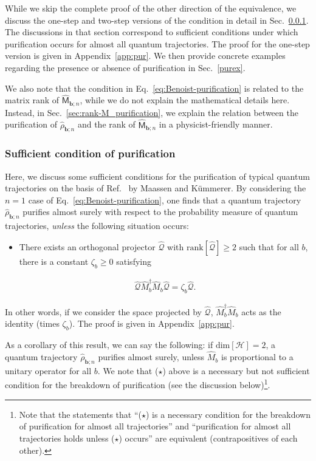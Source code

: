 \documentclass[preprint,pteplogo]{ptephy_v2}%
\numberwithin{equation}{section}
\theoremstyle{definition}
\newcommand{\ml}[1]{\mathcal{#1}}
\newcommand{\mr}[1]{\mathrm{#1}}
\newcommand{\aln}[1]{
\begin{align}
#1
\end{align}
}
\begin{document}
While we skip the complete proof of the other direction of the equivalence, we discuss the one-step and two-step versions of the condition in detail in Sec.~\ref{purMK}. 
The discussions in that section correspond to sufficient conditions under which purification occurs for almost all quantum trajectories.
The proof for the one-step version is given in Appendix~\ref{app:pur}.
We then provide concrete examples regarding the presence or absence of purification in Sec.~\ref{purex}.
 
We also note that the condition in Eq.~\eqref{eq:Benoist-purification} is related to the matrix rank of $\hat{\mathsf{M}}_{\bm{b};n}$, while we do not explain the mathematical details here. 
Instead, in Sec.~\ref{sec:rank-M_purification}, we explain the relation between the purification of $\hat{\rho}_{\bm{b};n}$ and the rank of $\hat{\mathsf{M}}_{\bm{b};n}$ in a physicist-friendly manner. 


\subsubsection{Sufficient condition of purification}\label{purMK}
Here, we discuss some sufficient conditions for the purification of typical quantum trajectories on the basis of Ref.~\cite{maassen2006purification} by Maassen and K\"ummerer.
By considering the $n=1$ case of Eq.~\eqref{eq:Benoist-purification}, one finds that a quantum trajectory $\hat{\rho}_{\bm{b};n}$ purifies almost surely with respect to the probability measure of quantum trajectories, \textit{unless} the following situation occurs:
\begin{itemize}    
\item[($\star$)]
There exists an orthogonal projector $\hat{\ml{Q}}$ with $\mr{rank}[\hat{\ml{Q}}]\geq 2$ such that for all $b$, there is a constant $\zeta_b \geq 0$ satisfying
\aln{\label{purjoken}
\hat{\ml{Q}}\hat{M}_b^\dag\hat{M}_b\hat{\ml{Q}}=\zeta_b\hat{\ml{Q}}.
}
\end{itemize}
In other words, if we consider the space projected by $\hat{\ml{Q}}$, $\hat{M}_b^\dag\hat{M}_b$ acts as the identity (times $\zeta_b$). 
The proof is given in Appendix~\ref{app:pur}.

As a corollary of this result, we can say the following:
if $\mr{dim}[\ml{H}]=2$, a quantum trajectory $\hat{\rho}_{\bm{b};n}$ purifies almost surely, unless $\hat{M}_b$ is proportional to a unitary operator for all $b$.
We note that ($\star$) above is a necessary but not sufficient condition for the breakdown of purification (see the discussion below)\footnote{
Note that the statements that ``($\star$) is a necessary condition for the breakdown of purification for almost all trajectories'' and ``purification for almost all trajectories holds unless ($\star$) occurs'' are equivalent (contrapositives of each other).
}.
\end{document}
